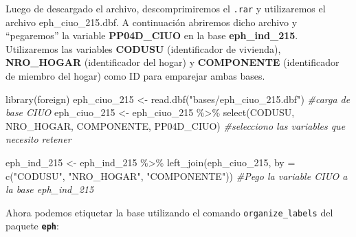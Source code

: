 \documentclass[
]{book}
\newenvironment{Shaded}{\begin{snugshade}}{\end{snugshade}}
\newcommand{\AttributeTok}[1]{\textcolor[rgb]{0.77,0.63,0.00}{#1}}
\newcommand{\CommentTok}[1]{\textcolor[rgb]{0.56,0.35,0.01}{\textit{#1}}}
\newcommand{\FunctionTok}[1]{\textcolor[rgb]{0.00,0.00,0.00}{#1}}
\newcommand{\NormalTok}[1]{#1}
\newcommand{\OtherTok}[1]{\textcolor[rgb]{0.56,0.35,0.01}{#1}}
\newcommand{\SpecialCharTok}[1]{\textcolor[rgb]{0.00,0.00,0.00}{#1}}
\newcommand{\StringTok}[1]{\textcolor[rgb]{0.31,0.60,0.02}{#1}}
\begin{document}
Luego de descargado el archivo, descomprimiremos el \texttt{.rar} y utilizaremos el archivo eph\_ciuo\_215.dbf. A continuación abriremos dicho archivo y ``pegaremos'' la variable \textbf{PP04D\_CIUO} en la base \textbf{eph\_ind\_215}. Utilizaremos las variables \textbf{CODUSU} (identificador de vivienda), \textbf{NRO\_HOGAR} (identificador del hogar) y \textbf{COMPONENTE} (identificador de miembro del hogar) como ID para emparejar ambas bases.

\begin{Shaded}
\begin{Highlighting}[]
\FunctionTok{library}\NormalTok{(foreign)}
\NormalTok{eph\_ciuo\_215 }\OtherTok{\textless{}{-}} \FunctionTok{read.dbf}\NormalTok{(}\StringTok{"bases/eph\_ciuo\_215.dbf"}\NormalTok{) }\CommentTok{\#carga de base CIUO}
\NormalTok{eph\_ciuo\_215 }\OtherTok{\textless{}{-}}\NormalTok{ eph\_ciuo\_215 }\SpecialCharTok{\%\textgreater{}\%} 
    \FunctionTok{select}\NormalTok{(CODUSU, NRO\_HOGAR, COMPONENTE, PP04D\_CIUO) }\CommentTok{\#selecciono las variables que necesito retener}

\NormalTok{eph\_ind\_215 }\OtherTok{\textless{}{-}}\NormalTok{ eph\_ind\_215 }\SpecialCharTok{\%\textgreater{}\%} 
    \FunctionTok{left\_join}\NormalTok{(eph\_ciuo\_215, }\AttributeTok{by =} \FunctionTok{c}\NormalTok{(}\StringTok{"CODUSU"}\NormalTok{, }\StringTok{"NRO\_HOGAR"}\NormalTok{, }\StringTok{"COMPONENTE"}\NormalTok{)) }\CommentTok{\#Pego la variable CIUO a la base eph\_ind\_215}
\end{Highlighting}
\end{Shaded}

Ahora podemos etiquetar la base utilizando el comando \texttt{organize\_labels} del paquete \textbf{\texttt{eph}}:

\begin{Shaded}
\end{Shaded}
\end{document}
